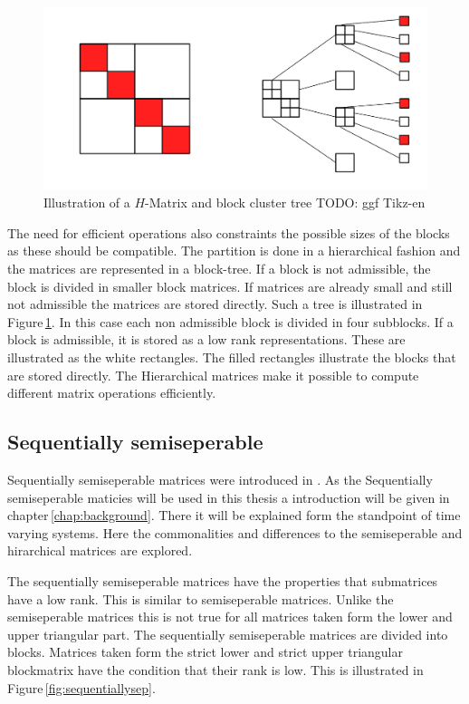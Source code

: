 \documentclass[doctype=mastersthesis,BCOR=15mm,biblatex]{ldvbook}%
\begin{document}
\begin{figure}
	\centering
	\includegraphics[width=0.7\linewidth]{diagrams/Struktur_H-matrix}
	\caption{Illustration of a $H$-Matrix and block cluster tree TODO: ggf Tikz-en}
	\label{fig:strukturh-matrix}
\end{figure}


The need for efficient operations also constraints the possible sizes of the blocks as these should be compatible.
The partition is done in a hierarchical fashion and the matrices are represented in a block-tree. 
If a block is not admissible, the block is divided in smaller block matrices.
If matrices are already small and still not admissible the matrices are stored directly.
Such a tree is illustrated in Figure\,\ref{fig:strukturh-matrix}.
In this case each non admissible block is divided in four subblocks. 
If a block is admissible, it is stored as a low rank representations.
These are illustrated as the white rectangles.
The filled rectangles illustrate the blocks that are stored directly.
The Hierarchical matrices make it possible to compute different matrix operations efficiently.


\subsection{Sequentially semiseperable}
Sequentially semiseperable matrices were introduced in \cite{dewilde_time-varying_1998}.
As the Sequentially semiseperable maticies will be used in this thesis a introduction will be given in chapter\,\ref{chap:background}. 
There it will be explained form the standpoint of time varying systems.
Here the commonalities and differences to the semiseperable and hirarchical matrices are explored.

The sequentially semiseperable matrices have the properties that submatrices have a low rank.
This is similar to semiseperable matrices. 
Unlike the semiseperable matrices this is not true for all matrices taken form the lower and upper triangular part.
The sequentially semiseperable matrices are divided into blocks.
Matrices taken form the strict lower and strict upper triangular blockmatrix have the condition that their rank is low.
This is illustrated in Figure\,\ref{fig:sequentiallysep}.
\end{document}
